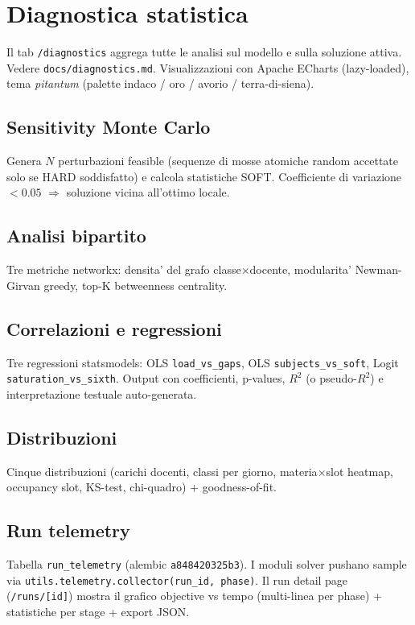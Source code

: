 \chapter{Diagnostica statistica}
\label{ch:diagnostica_statistica}


Il tab \texttt{/diagnostics} aggrega tutte le analisi sul
modello e sulla soluzione attiva. Vedere
\texttt{docs/diagnostics.md}. Visualizzazioni con Apache
ECharts (lazy-loaded), tema \emph{pitantum} (palette indaco /
oro / avorio / terra-di-siena).

\section{Sensitivity Monte Carlo}
Genera $N$ perturbazioni feasible (sequenze di mosse atomiche
random accettate solo se HARD soddisfatto) e calcola statistiche
SOFT. Coefficiente di variazione $< 0.05$ $\Rightarrow$
soluzione vicina all'ottimo locale.

\section{Analisi bipartito}
Tre metriche networkx: densita' del grafo classe$\times$docente,
modularita' Newman-Girvan greedy, top-K betweenness centrality.

\section{Correlazioni e regressioni}
Tre regressioni statsmodels: OLS \texttt{load\_vs\_gaps},
OLS \texttt{subjects\_vs\_soft}, Logit
\texttt{saturation\_vs\_sixth}. Output con coefficienti,
p-values, $R^2$ (o pseudo-$R^2$) e interpretazione testuale
auto-generata.

\section{Distribuzioni}
Cinque distribuzioni (carichi docenti, classi per giorno,
materia$\times$slot heatmap, occupancy slot, KS-test, chi-quadro)
+ goodness-of-fit.

\section{Run telemetry}
Tabella \texttt{run\_telemetry} (alembic
\texttt{a848420325b3}). I moduli solver pushano sample via
\texttt{utils.telemetry.collector(run\_id, phase)}. Il run detail
page (\texttt{/runs/[id]}) mostra il grafico objective vs tempo
(multi-linea per phase) + statistiche per stage + export JSON.

